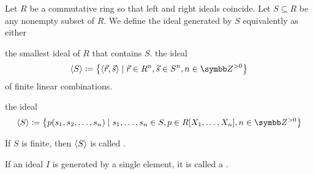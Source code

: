 \begin{definition}\label{def:generated_ring_ideal}
  Let \( R \) be a commutative ring so that left and right ideals coincide. Let \( S \subseteq R \) be any nonempty subset of \( R \). We define the ideal generated by \( S \) equivalently as either
  \begin{defenum}
     the smallest ideal of \( R \) that contains \( S \).
     the ideal
    \begin{equation*}
      \Gen S \coloneqq \left\{ \Prod {\vec r} {\vec s} \mid \vec r \in R^n, \vec s \in S^n, n \in \Z^{>0} \right\}
    \end{equation*}
    of finite linear combinations.

     the ideal
    \begin{equation*}
      \Gen S \coloneqq \left\{ p(s_1, s_2, \ldots, s_n) \mid s_1, \ldots, s_n \in S, p \in R[X_1, \ldots, X_n], n \in \Z^{>0} \right\}
    \end{equation*}
  \end{defenum}

  If \( S \) is finite, then \( \left\langle S \right\rangle \) is called .
\end{definition}

\begin{definition}\label{def:principal_ideal}
  If an ideal \( I \) is generated by a single element, it is called a .
\end{definition}
